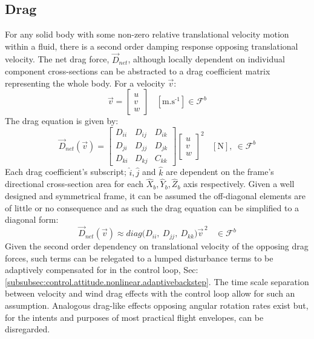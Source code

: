 \subsection{Drag}
\label{subsec:dynamics.aero.drag}
For any solid body with some non-zero relative translational velocity motion within a fluid, there is a second order damping response opposing translational velocity. The net drag force, $\vec{D}_{net}$, although locally dependent on individual component cross-sections can be abstracted to a drag coefficient matrix representing the whole body. For a velocity $\vec{v}$:
\begin{equation}
\vec{v}=\begin{bmatrix}
u\\
v\\
w
\end{bmatrix}~~~~[\text{m.s}^{\text{-}1}]\in\mathcal{F}^{b}
\end{equation}
The drag equation is given by:
\begin{equation}\label{eq:distrubance}
\vec{D}_{net}(\vec{v})=\begin{bmatrix}
D_{ii} & D_{ij} & D_{ik}\\
D_{ji} & D_{jj} & D_{jk}\\
D_{ki} & D_{kj} & C_{kk}
\end{bmatrix}
\begin{bmatrix}
u\\
v\\
w
\end{bmatrix}^2
~~~~[\text{N}],~\in\mathcal{F}^b
\end{equation}
Each drag coefficient's subscript; $\hat{i},\hat{j}$ and $\hat{k}$ are dependent on the frame's directional cross-section area for each $\hat{X}_b,\hat{Y}_b,\hat{Z}_b$ axis respectively. Given a well designed and symmetrical frame, it can be assumed the off-diagonal elements are of little or no consequence and as such the drag equation can be simplified to a diagonal form:
\begin{equation}
\vec{D}_{net}(\vec{v})\approx diag\big(D_{ii},~D_{jj},~D_{kk}\big)\vec{v}^{\hspace{2pt}2}~~~~\in\mathcal{F}^b
\end{equation}
Given the second order dependency on translational velocity of the opposing drag forces, such terms can be relegated to a lumped disturbance terms to be adaptively compensated for in the control loop, Sec:\ref{subsubsec:control.attitude.nonlinear.adaptivebackstep}. The time scale separation between velocity and wind drag effects with the control loop allow for such an assumption. Analogous drag-like effects opposing angular rotation rates exist but, for the intents and purposes of most practical flight envelopes, can be disregarded.
